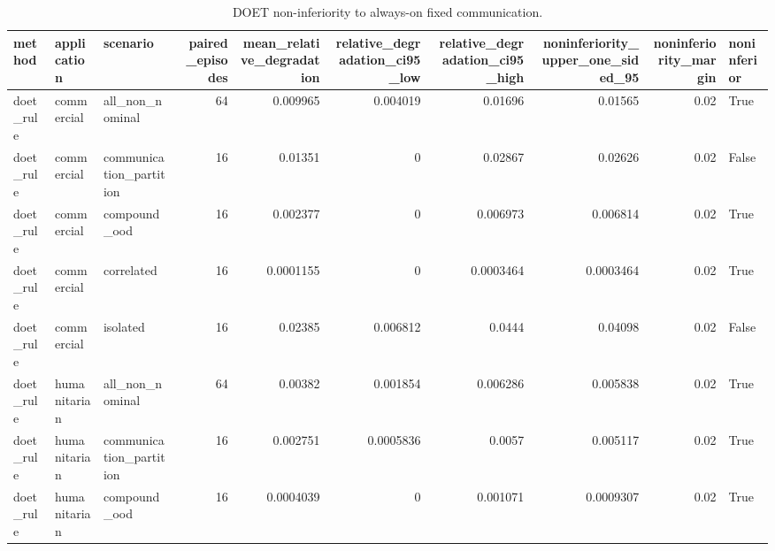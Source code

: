\begin{table}
\centering
\caption{DOET non-inferiority to always-on fixed communication.}
\begin{tabular}{lllrrrrrrl}
\toprule
   method &  application &                scenario &  paired\_episodes &  mean\_relative\_degradation &  relative\_degradation\_ci95\_low &  relative\_degradation\_ci95\_high &  noninferiority\_upper\_one\_sided\_95 &  noninferiority\_margin &  noninferior \\
\midrule
doet\_rule &   commercial &         all\_non\_nominal &               64 &                   0.009965 &                       0.004019 &                         0.01696 &                            0.01565 &                   0.02 &         True \\
doet\_rule &   commercial & communication\_partition &               16 &                    0.01351 &                              0 &                         0.02867 &                            0.02626 &                   0.02 &        False \\
doet\_rule &   commercial &            compound\_ood &               16 &                   0.002377 &                              0 &                        0.006973 &                           0.006814 &                   0.02 &         True \\
doet\_rule &   commercial &              correlated &               16 &                  0.0001155 &                              0 &                       0.0003464 &                          0.0003464 &                   0.02 &         True \\
doet\_rule &   commercial &                isolated &               16 &                    0.02385 &                       0.006812 &                          0.0444 &                            0.04098 &                   0.02 &        False \\
doet\_rule & humanitarian &         all\_non\_nominal &               64 &                    0.00382 &                       0.001854 &                        0.006286 &                           0.005838 &                   0.02 &         True \\
doet\_rule & humanitarian & communication\_partition &               16 &                   0.002751 &                      0.0005836 &                          0.0057 &                           0.005117 &                   0.02 &         True \\
doet\_rule & humanitarian &            compound\_ood &               16 &                  0.0004039 &                              0 &                        0.001071 &                          0.0009307 &                   0.02 &         True \\

\end{tabular}
\end{table}
